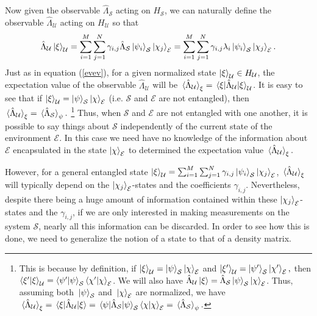 \documentclass[letter, 12pt]{turabian-thesis}
\theoremstyle{hypothesis}
\let\origfootnote\footnote %
\renewcommand{\footnote}[1]{%
\noindent %
\origfootnote{#1}}
\begin{document}
 Now given the observable $\hat{\Lambda}_{\mathcal{S}}$ acting on $H_\mathcal{S}$, we can  naturally define the observable $\hat{\Lambda}_\mathcal{U}$ acting on $H_\mathcal{U}$ so that 
\begin{equation}\label{extension}\hat{\Lambda}_\mathcal{U}\ket{\xi}_\mathcal{U}=\sum_{i=1}^M\sum_{j=1}^N\gamma_{i,j}\hat{\Lambda}_\mathcal{S}\ket{\psi_i}_\mathcal{S}\ket{\chi_j}_\mathcal{E}=\sum_{i=1}^M\sum_{j=1}^N\gamma_{i,j}\lambda_i\ket{\psi_i}_\mathcal{S}\ket{\chi_j}_\mathcal{E}.
\end{equation}
Just as in equation (\ref{evev}), for a given normalized state $\ket{\xi}_\mathcal{U}\in H_\mathcal{U}$, the expectation value of the observable $\hat{\Lambda}_\mathcal{U}$ will be $\ev*{\hat{\Lambda}_\mathcal{U}}_\xi=\ev*{\hat{\Lambda}_\mathcal{U}}{\xi}_\mathcal{U}$. It is easy to see that if $\ket{\xi}_\mathcal{U}=\ket{\psi}_\mathcal{S}\ket{\chi}_\mathcal{E}$ (i.e. $\mathcal{S}$ and $\mathcal{E}$ are not entangled), then $\ev*{\hat{\Lambda}_\mathcal{U}}_\xi=\ev*{\hat{\Lambda}_\mathcal{S}}_\psi.$\footnote{\label{untangledobservable}This is because by definition, if $\ket{\xi}_\mathcal{U}=\ket{\psi}_\mathcal{S}\ket{\chi}_\mathcal{E}$ and $\ket{\xi'}_\mathcal{U}=\ket{\psi'}_\mathcal{S}\ket{\chi'}_\mathcal{E},$ then $\ip{\xi'}{\xi}_\mathcal{U}=\ip{\psi'}{\psi}_\mathcal{S}\ip{\chi'}{\chi}_\mathcal{E}$. We will also have $\hat{\Lambda}_\mathcal{U}\ket{\xi}=\hat{\Lambda}_\mathcal{S}\ket{\psi}_\mathcal{S}\ket{\chi}_\mathcal{E}$. Thus, assuming both $\ket*{\psi}_\mathcal{S}$ and $\ket*{\chi}_\mathcal{E}$ are normalized, we have $\ev*{\hat{\Lambda}_\mathcal{U}}_\xi=\ev*{\hat{\Lambda}_\mathcal{U}}{\xi}=\ev*{\hat{\Lambda}_\mathcal{S}}{\psi}_\mathcal{S}\ip{\chi}{\chi}_\mathcal{E}=\ev*{\hat{\Lambda}_\mathcal{S}}_\psi.$ } Thus, when $\mathcal{S}$ and $\mathcal{E}$ are not entangled with one another, it is possible to say things about $\mathcal{S}$ independently of the current state of the environment  $\mathcal{E}$. In this case we need have no knowledge of the information about $\mathcal{E}$ encapsulated in the state $\ket{\chi}_\mathcal{E}$ to determined the expectation value $\ev*{\hat{\Lambda}_\mathcal{U}}_\xi. $

However, for a general entangled state $\ket{\xi}_\mathcal{U}=\sum_{i=1}^M\sum_{j=1}^N\gamma_{i,j}\ket{\psi_i}_\mathcal{S}\ket{\chi_j}_\mathcal{E}$,  $\ev*{\hat{\Lambda}_\mathcal{U}}_\xi $ will typically depend on the $\ket{\chi_j}_\mathcal{E}$-states and the coefficients $\gamma_{i,j}$. Nevertheless, despite there being a huge amount of information contained within these $\ket{\chi_j}_\mathcal{E}$-states and the  $\gamma_{i,j}$, if we are only interested in making measurements on the system $\mathcal{S}$, nearly all this information can be discarded. In order to see how this is done, we need to generalize the notion of a state to that of a density matrix. 
\end{document}
